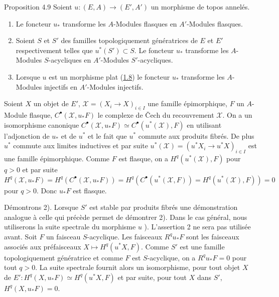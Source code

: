 \documentclass[10pt]{../fichiers-configuration-latex/smfart}
\begin{document}
\begin{enonce*}{Proposition 4.9}
Soient $u : (E, A) \to (E', A')$ un morphisme de topos annelés.
\begin{enumerate}
\renewcommand{\labelenumi}{\theenumi)}
\item Le foncteur $u_\ast$ transforme les $A$-Modules flasques en
  $A'$-Modules flasques.

\item Soient $S$ et $S'$ des familles topologiquement génératrices
  de $E$ et $E'$ respectivement telles que $u^\ast(S') \subset S$. Le
  foncteur $u_\ast$ transforme les $A$-Modules $S$-acycliques en
  $A'$-Modules $S'$-acycliques.

\item Lorsque $u$ est un morphisme plat (\hyperref[V.def1.8]{1.8}) le foncteur $u_\ast$
  transforme les $A$-Modules injectifs en $A'$-Modules injectifs.
\end{enumerate}
\end{enonce*}

Soient $X$ un objet de $E'$, $𝒳  = (X_i \to X)_{i \in I}$ une
famille épimorphique, $F$ un $A$-Module flasque, $C^{∙}(𝒳 ,
u_\ast F)$ le complexe de Čech du recouvrement
$𝒳 $. On a un isomorphisme canonique
$C^{∙}(𝒳 , u_\ast
F) \simeq C^{∙}(u^\ast (𝒳 ), F)$ en utilisant l'adjonction de
$u_\ast$ et de $u^\ast$ et le fait que $u^\ast$ commute aux produits
fibrés. De plus $u^\ast$ commute aux limites inductives et par suite
$u^\ast(𝒳 ) = (u^\ast X_i \to u^\ast X)_{i \in I}$ est une famille
épimorphique. Comme $F$ est flasque, on a $H^q(u^\ast(𝒳 ),
F)$ pour $q > 0$ et par suite $H^q(𝒳 , u_\ast F) = H^q(C^{∙}
(𝒳 , u_\ast F)) = H^q(C^{∙} (u^\ast(𝒳 , F)) = H^q
(u^\ast(𝒳 ), F)) = 0$ pour $q > 0$. Donc $u_\ast F$ est flasque.

Démontrons 2). Lorsque $S'$ est stable par produits fibrés une
démonstration analogue à celle qui précède permet de démontrer 2).
Dans le cas général, nous utiliserons la suite spectrale du
morphisme $u$ ). L'assertion 2 ne sera pas utilisée
avant\pageoriginale {}. Soit $F$ un faisceau
$S$-acyclique. Les faisceaux $R^q u_\ast F$ sont les faisceaux
associés aux préfaisceaux $X \mapsto H^q(u^\ast X, F)$. Comme $S'$
est une famille topologiquement génératrice et comme $F$ est
$S$-acyclique, on a $R^q u_\ast F = 0$ pour tout $q > 0$. La suite
spectrale  fournit alors un isomorphisme, pour tout
objet $X$ de $E' : H^q (X, u_\ast F) \simeq H^q (u^\ast X, F)$ et
par suite, pour tout $X$ dans $S'$, $H^q (X, u_\ast F) = 0$.
\end{document}
